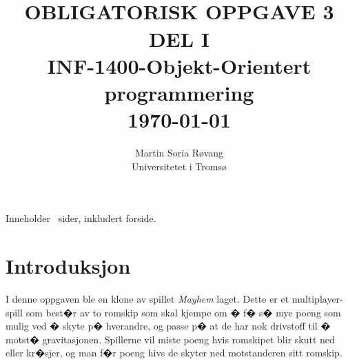 
\usepackage{amssymb}
\usepackage{gensymb}
\usepackage{amsmath}
\usepackage{mathtools}


{\selectfont
\title{ \normalsize \textsc{}
		\\ [1.0cm] %
        \LARGE \textbf{\uppercase{Obligatorisk Oppgave 3\\Del I}
        \HRule{0.5pt} \\ [0.5cm]
        INF-1400-Objekt-Orientert programmering
        \\
		\normalsize \today \vspace*{5\baselineskip}}
		}

        \date{}
\author{
		Martin Soria Røvang \\ 
        Universitetet i Tromsø \\}

\clearpage\maketitle
\vspace{0.2\textheight}
{\centering
Inneholder \pageref{LastPage} \, sider, inkludert forside.\par
}
\thispagestyle{empty}

\newpage
\tableofcontents
\newpage


\section{Introduksjon}

I denne oppgaven ble en klone av spillet \emph{Mayhem} laget. Dette er et multiplayer-spill som best�r av to romskip som skal kjempe om � f� s� mye poeng som mulig ved � skyte p� hverandre, og passe p� at de har nok drivstoff til � motst� gravitasjonen. Spillerne vil miste poeng hvis romskipet blir skutt ned eller kr�sjer, og man f�r poeng hivs de skyter ned motstanderen sitt romskip.


}
